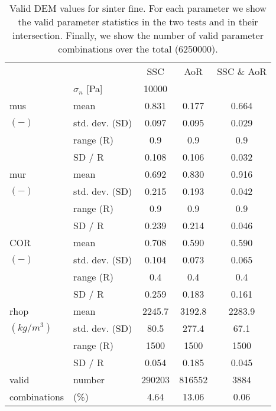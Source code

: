 \begin{table}%
\centering
\begin{tabular}{ll|ccc}
\hline

          &  & SSC & AoR   & SSC \& AoR \\
           & $\sigma_n$  [Pa]  & 10000 &   &  \\ 
          \hline

    \acs{mus} & mean  & 0.831 & 0.177 & 0.664 \\
    $(-)$   & std. dev. (SD) & 0.097 & 0.095 & 0.029 \\
          & range (\acs{R}) & 0.9   & 0.9   & 0.9 \\
          & SD / R & 0.108 & 0.106 & 0.032 \\
          \hline
    \acs{mur} & mean  & 0.692 & 0.830 & 0.916 \\
    $(-)$   & std. dev. (SD) & 0.215 & 0.193 & 0.042 \\
          & range (\acs{R}) & 0.9   & 0.9   & 0.9 \\
          & SD / R & 0.239 & 0.214 & 0.046 \\
          \hline
              COR   & mean  & 0.708 & 0.590 & 0.590 \\
    $(-)$   & std. dev. (SD) & 0.104 & 0.073 & 0.065 \\
          & range (\acs{R}) & 0.4   & 0.4   & 0.4 \\
          & SD / R & 0.259 & 0.183 & 0.161 \\
          \hline
    \acs{rhop} & mean  & 2245.7 & 3192.8 & 2283.9 \\
    $(kg/m^3)$ & std. dev. (SD) & 80.5  & 277.4 & 67.1 \\
          & range (\acs{R}) & 1500  & 1500  & 1500 \\
          & SD / R & 0.054 & 0.185 & 0.045 \\
          \hline
    valid & number & 290203 & 816552 & 3884 \\
    combinations & (\%) & 4.64  & 13.06 & 0.06 \\  

\hline
\end{tabular}
\caption[Valid DEM values for sinter fine]{Valid DEM values for sinter fine. For
each parameter we show the valid parameter statistics in the two tests and in their intersection.
Finally, we show the number of valid parameter combinations over the total
(6250000).}
\label{tab:13DEMvalidvalues}
\end{table}
